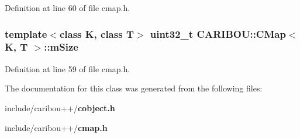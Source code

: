 Definition at line 60 of file cmap.\+h.

\subsubsection[{m\+Size}]{\setlength{\rightskip}{0pt plus 5cm}template$<$class K, class T$>$ uint32\+\_\+t {\bf C\+A\+R\+I\+B\+O\+U\+::\+C\+Map}$<$ K, T $>$\+::m\+Size\hspace{0.3cm}{\ttfamily [protected]}}\label{class_c_a_r_i_b_o_u_1_1_c_map_a525c81d3be31a134a5d4afc56eede27b}


Definition at line 59 of file cmap.\+h.



The documentation for this class was generated from the following files\+:\begin{DoxyCompactItemize}
\item 
include/caribou++/{\bf cobject.\+h}\item 
include/caribou++/{\bf cmap.\+h}\end{DoxyCompactItemize}
